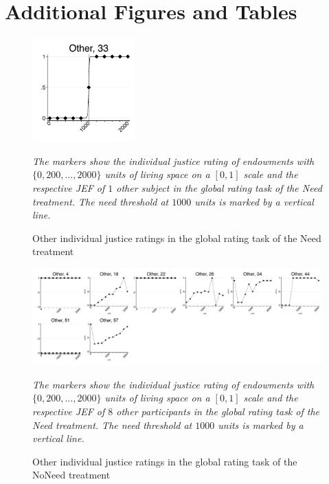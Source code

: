 \documentclass[12pt]{scrartcl}
\begin{document}
\newpage
\appendix


\section{Additional Figures and Tables}\label{sec:app_additional}
\begin{figure}[hb]
   \centering
   \includegraphics[width=4cm]{figures/figure_11.pdf}
   \begin{minipage}{\linewidth}
      \footnotesize
      \textit{The markers show the individual justice rating of endowments with $\{0,200,\ldots,2000\}$ units of living space on a $[0,1]$ scale and the respective JEF of $1$ other subject in the global rating task of the Need treatment. The need threshold at $1000$ units is marked by a vertical line.}
   \end{minipage}
   \caption{Other individual justice ratings in the global rating task of the Need treatment}\label{fig:figure_11}
\end{figure}

\begin{figure}[hb]
   \centering
   \includegraphics[width=\linewidth]{figures/figure_12.pdf}
   \begin{minipage}{\linewidth}
      \footnotesize
      \textit{The markers show the individual justice rating of endowments with $\{0,200,\ldots,2000\}$ units of living space on a $[0,1]$ scale and the respective JEF of $8$ other participants in the global rating task of the Need treatment. The need threshold at $1000$ units is marked by a vertical line.}
   \end{minipage}
   \caption{Other individual justice ratings in the global rating task of the NoNeed treatment}\label{fig:figure_12}
\end{figure}
\end{document}
